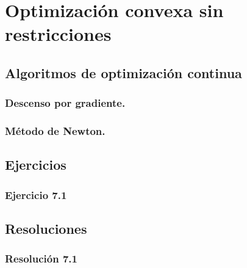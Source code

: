 \section{Optimización convexa sin restricciones}

\subsection{Algoritmos de optimización continua}

\subsubsection{Descenso por gradiente.}

\subsubsection{Método de Newton.}

\subsection{Ejercicios}

\subsubsection{Ejercicio 7.1}


\subsection{Resoluciones}

\subsubsection{Resolución 7.1}

